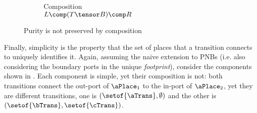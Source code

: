 \begin{figure}[ht]
\begin{subfigure}{0.35\textwidth}
    \caption{Composition\\$L \comp (T \tensor B) \comp R$}
    \end{subfigure}
    \caption{Purity is not preserved by composition}
    \label{fig:pureComponents}
\end{figure}

Finally, simplicity is the property that the set of places that a transition
connects to uniquely identifies it. Again, assuming the naive extension to PNBs
(i.e. also considering the boundary ports in the unique \emph{footprint}),
consider the components shown in . Each component
is simple, yet their composition is not: both transitions connect the out-port
of $\aPlace_1$ to the in-port of $\aPlace_2$, yet they are different
transitions, one is $(\setof{\aTrans}, \emptyset)$ and the other is
$(\setof{\bTrans}, \setof{\cTrans})$.

